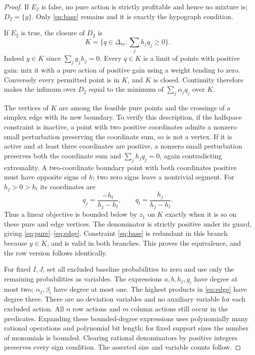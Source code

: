 \documentclass[11pt]{article}
\theoremstyle{remark}
\begin{document}
\begin{proof}
If $E_2$ is false, no pure action is strictly profitable and hence no mixture is; $D_2=\{y\}$. Only \eqref{eq:base} remains and it is exactly the hypograph condition.

If $E_2$ is true, the closure of $D_2$ is
\[
 K=\{q\in\Delta_m:\textstyle\sum_jh_jq_j\ge0\}.
\]
Indeed $y\in K$ since $\sum_j y_jh_j=0$. Every $q\in K$ is a limit of points with positive gain: mix it with a pure action of positive gain using a weight tending to zero. Conversely every permitted point is in $K$, and $K$ is closed. Continuity therefore makes the infimum over $D_2$ equal to the minimum of $\sum_j\alpha_jq_j$ over $K$.

The vertices of $K$ are among the feasible pure points and the crossings of a simplex edge with its new boundary. To verify this description, if the halfspace constraint is inactive, a point with two positive coordinates admits a nonzero small perturbation preserving the coordinate sum, so is not a vertex. If it is active and at least three coordinates are positive, a nonzero small perturbation preserves both the coordinate sum and $\sum_jh_jq_j=0$, again contradicting extremality. A two-coordinate boundary point with both coordinates positive must have opposite signs of $h$; two zero signs leave a nontrivial segment. For $h_j>0>h_l$ its coordinates are
\[
 q_j=\frac{-h_l}{h_j-h_l},\qquad q_l=\frac{h_j}{h_j-h_l}.
\]
Thus a linear objective is bounded below by $z_1$ on $K$ exactly when it is so on these pure and edge vertices. The denominator is strictly positive under its guard, giving \eqref{eq:pure}--\eqref{eq:edge}. Constraint \eqref{eq:base} is redundant in this branch because $y\in K$, and is valid in both branches. This proves the equivalence, and the row version follows identically.

For fixed $I,J$, set all excluded baseline probabilities to zero and use only the remaining probabilities as variables. The expressions $a,b,h_j,g_i$ have degree at most two; $\alpha_j,\beta_i$ have degree at most one. The highest products in \eqref{eq:edge} have degree three. There are no deviation variables and no auxiliary variable for each excluded action. All $n$ row actions and $m$ column actions still occur in the predicates. Expanding these bounded-degree expressions uses polynomially many rational operations and polynomial bit length; for fixed support sizes the number of monomials is bounded. Clearing rational denominators by positive integers preserves every sign condition. The asserted size and variable counts follow.
\end{proof}
\end{document}
